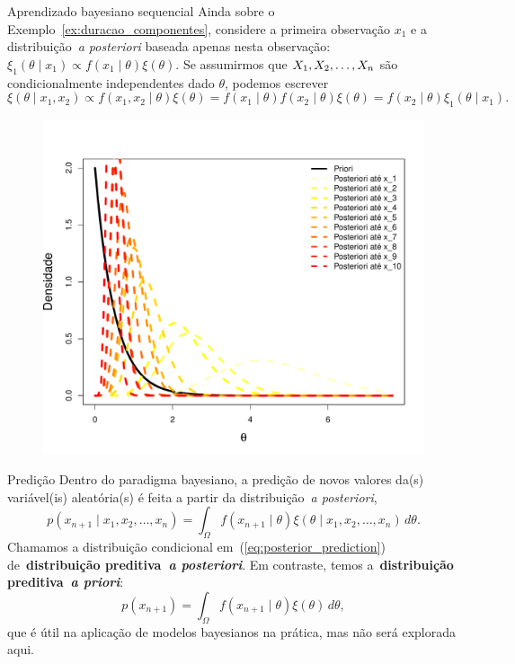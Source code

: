 \begin{frame}{Aprendizado bayesiano sequencial}
Ainda sobre o Exemplo~\ref{ex:duracao_componentes}, considere a primeira observação $x_1$ e a distribuição~\textit{a posteriori} baseada apenas nesta observação: $\xi_1(\theta \mid x_1) \propto f(x_1 \mid \theta)\xi(\theta)$.
Se assumirmos que $X_1, X_2, \ldots, X_n$ são condicionalmente independentes dado $\theta$, podemos escrever 
\[\xi(\theta \mid x_1, x_2) \propto f(x_1, x_2 \mid \theta)\xi(\theta) = f(x_1 \mid \theta)f(x_2 \mid \theta)\xi(\theta) = f(x_2 \mid \theta)\xi_1(\theta \mid x_1). \]
    \begin{figure}[!ht]
    \label{fig:posterior_componentes_sequencial}
    \begin{center}
    \includegraphics[scale=0.32]{figures/sequential_Bayes_componentes.pdf} 
    \end{center} 
    \end{figure} 
\end{frame}
\begin{frame}{Predição}
 Dentro do paradigma bayesiano, a predição de novos valores da(s) variável(is) aleatória(s) é feita a partir da distribuição~\textit{a posteriori},
 \begin{equation}
  \label{eq:posterior_prediction}
  p(x_{n+1} \mid x_1, x_2, \ldots, x_n) = \int_{\Omega} f(x_{n+1} \mid \theta)\xi(\theta \mid x_1, x_2, \ldots, x_n)\, d\theta.
 \end{equation}
Chamamos a distribuição condicional em~(\ref{eq:posterior_prediction}) de~\textbf{distribuição preditiva~\textit{a posteriori}}.
Em contraste, temos a~\textbf{distribuição preditiva~\textit{a priori}}:
 \begin{equation}
  \label{eq:prior_prediction}
  p(x_{n+1}) = \int_{\Omega} f(x_{n+1} \mid \theta)\xi(\theta)\, d\theta,
 \end{equation}
que é útil na aplicação de modelos bayesianos na prática, mas não será explorada aqui.
\end{frame}

